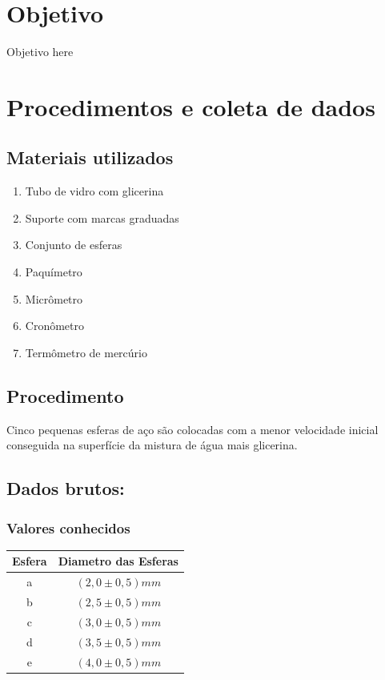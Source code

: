 \documentclass[english,brazil]{article}
\providecommand{\tabularnewline}{\\}
\providecommand{\tabularnewline}{\\}
\begin{document}
\section{Objetivo}

	Objetivo here

\section{Procedimentos e coleta de dados}


\subsection{Materiais utilizados}
	\begin{enumerate}
		\item Tubo de vidro com glicerina
		\item Suporte com marcas graduadas
		\item Conjunto de esferas
		\item Paquímetro 
		\item Micrômetro
		\item Cronômetro
		\item Termômetro de mercúrio
	\end{enumerate}

\subsection{Procedimento}

	Cinco pequenas esferas de aço são colocadas com a menor velocidade
	inicial conseguida na superfície da mistura de água mais glicerina.

\subsection{Dados brutos:}

\subsubsection{Valores conhecidos}

\begin{table}[H]
	\centering{}%
	\begin{tabular}{|c|c|}
		\hline 
		Esfera & Diametro das Esferas \tabularnewline
		\hline 
		a & $(2,0\pm0,5)\unit{mm}$\tabularnewline
		\hline 
		b & $(2,5\pm0,5)\unit{mm}$\tabularnewline
		\hline 
		c & $(3,0\pm0,5)\unit{mm}$\tabularnewline
		\hline 
		d & $(3,5\pm0,5)\unit{mm}$\tabularnewline
		\hline 
		e & $(4,0\pm0,5)\unit{mm}$\tabularnewline
		\hline 
	\end{tabular}
\end{table}
\end{document}
